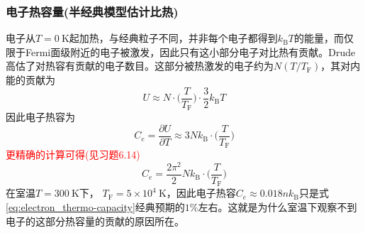 \subsubsection{电子热容量(半经典模型估计比热)}
电子从$T=0~\mathrm{K}$起加热，与经典粒子不同，并非每个电子都得到$k_{\mathrm{B}}T$的能量，而仅限于Fermi面级附近的电子被激发，因此只有这小部分电子对比热有贡献。Drude高估了对热容有贡献的电子数目。这部分被热激发的电子约为$N(T/T_{\mathrm{F}})$，其对内能的贡献为
\begin{equation}
	U\approx N\cdot\bigg(\dfrac{T}{T_{\mathrm{F}}}\bigg)\cdot\dfrac32k_{\mathrm{B}}T
	\label{eq:electron-thermo-U}
\end{equation}
因此电子热容为
\begin{equation}
	C_e=\dfrac{\partial U}{\partial T}\approx3Nk_{\mathrm{B}}\cdot\bigg(\dfrac{T}{T_{\mathrm{F}}}\bigg)
	\label{eq:electron-thermo-capacity-approx}
\end{equation} 
\textcolor{red}{更精确的计算可得(见习题6.14)}
\begin{equation}
	C_e=\dfrac{2\pi^2}2Nk_{\mathrm{B}}\cdot\bigg(\dfrac{T}{T_{\mathrm{F}}}\bigg)
	\label{eq:electron-thermo-capacity}
\end{equation}
在室温$T=300~\mathrm{K}$下， $T_{\mathrm{F}}=5\times10^4~\mathrm{K}$，因此电子热容$C_e\approx0.018nk_{\mathrm{B}}$只是式\eqref{eq:electron_thermo-capacity}经典预期的$1\%$左右。这就是为什么室温下观察不到电子的这部分热容量的贡献的原因所在。

